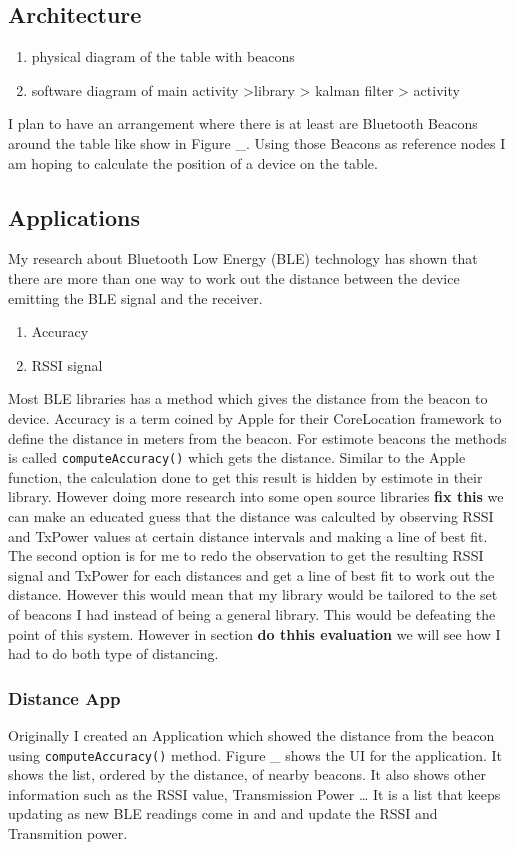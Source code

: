 \subsection{Architecture}
 \begin{enumerate}
 \item physical diagram of the table with beacons
 \item software diagram of main activity \-\->library \-\-> kalman filter \-\-> activity
 \end{enumerate}
 I plan to have an arrangement where there is at least are Bluetooth Beacons around the table like show in Figure \_. Using those Beacons as reference nodes I am hoping to calculate the position of a device on the table.

\subsection{Applications}
My research about Bluetooth Low Energy (BLE) technology has shown that there are more than one way to work out the distance between the device emitting the BLE signal and the receiver. 
\begin{enumerate}
\item Accuracy
\item RSSI signal
\end{enumerate}
Most BLE libraries has a method which gives the distance from the beacon to device. Accuracy is a term coined by Apple for their CoreLocation framework to define the distance in meters from the beacon. For estimote beacons the methods is called  \lstinline|computeAccuracy()| which gets the distance. Similar to the Apple function, the calculation done to get this result is hidden by estimote in their library. However doing more research into some open source libraries \textbf{fix this}\cite{radius-ranging} we can make an educated guess that the distance was calculted by observing RSSI and TxPower values at certain distance intervals and making a line of best fit.
The second option is for me to redo the observation to get the resulting RSSI signal and TxPower for each distances and get a line of best fit to work out the distance. However this would mean that my library would be tailored to the set of beacons I had instead of being a general library. This would be defeating the point of this system. However in section \textbf{do thhis evaluation} we will see how I had to do both type of distancing.

\subsubsection{Distance App}
Originally I created an Application which showed the distance from the beacon using \lstinline|computeAccuracy()| method. Figure \_ shows the UI for the application. It shows the list, ordered by the distance, of nearby beacons. It also shows other information such as the RSSI value, Transmission Power \ldots
It is a list that keeps updating as new BLE readings come in and and update the RSSI and Transmition power.

